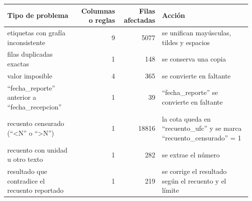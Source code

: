 \begin{tabular}{lrrl}
\toprule
Tipo de problema & Columnas o reglas & Filas afectadas & Acción \\
\midrule
etiquetas con grafía inconsistente & 9 & 5077 & se unifican mayúsculas, tildes y espacios \\
filas duplicadas exactas & 1 & 148 & se conserva una copia \\
valor imposible & 4 & 365 & se convierte en faltante \\
``fecha\_reporte'' anterior a ``fecha\_recepcion'' & 1 & 39 & ``fecha\_reporte'' se convierte en faltante \\
recuento censurado (``<N'' o ``>N'') & 1 & 18816 & la cota queda en ``recuento\_ufc'' y se marca ``recuento\_censurado'' = 1 \\
recuento con unidad u otro texto & 1 & 282 & se extrae el número \\
resultado que contradice el recuento reportado & 1 & 219 & se corrige el resultado según el recuento y el límite \\
\bottomrule
\end{tabular}
